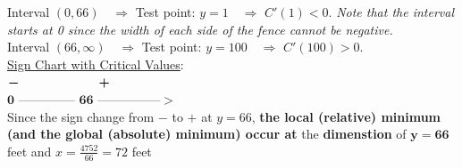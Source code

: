 \begin{example}
\begin{solL}
	Interval $(0,66)\quad \Longrightarrow$ \quad Test point: $y=1 \quad \Longrightarrow$ \quad $C'(1)<0$. \emph{Note that the interval starts at 0 since the width of each side of the fence cannot be negative.}\\
	Interval $(66,\infty)\quad \Longrightarrow$ \quad Test point: $y=100 \quad \Longrightarrow$ \quad $C'(100)>0$.\\
	
	\underline{Sign Chart with Critical Values}:\\
	
	\hspace*{1cm}$\bm{-}\hspace{2.25cm} \bm{+} $\\
	$\bm{0}$ -------------- $\bm{66}$  ---------------$>$\\
	
	Since the sign change from $-$ to $+$ at $y=66$,  \textbf{the local (relative) minimum (and the global (absolute) minimum) occur at} the \textbf{dimenstion} of $\bm{y=66}$ feet and $x=\frac{4752}{66}=72$ feet \\
\newline
    
    \end{solL}
    
	
\end{example}

